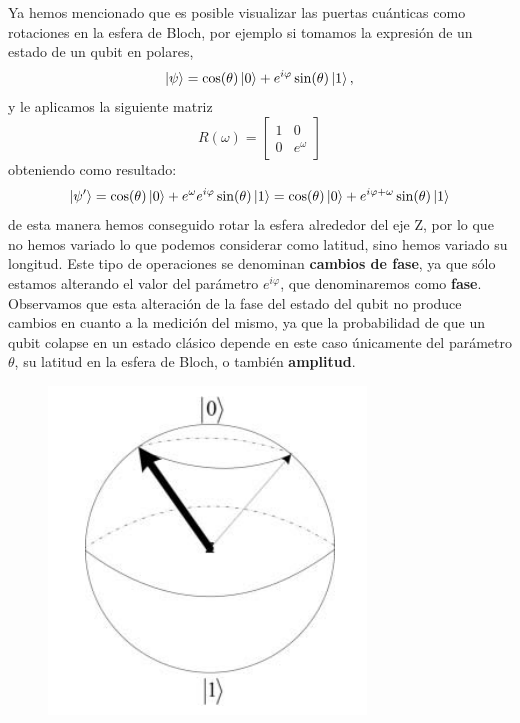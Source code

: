 \documentclass[a4paper]{article}
\numberwithin{equation}{section}
\begin{document}
Ya hemos mencionado que es posible visualizar las puertas cuánticas como rotaciones en la esfera de Bloch, por ejemplo si tomamos la expresión de un estado de un qubit en polares,
\begin{equation}
\ket{\psi} = \cos(\theta)\ket{0} + e^{i\varphi}\sin(\theta)\ket{1},
\end{equation}
y le aplicamos la siguiente matriz
\begin{equation}
R(\omega) = \begin{bmatrix}
	1 & 0 \\
	0 & e^\omega
\end{bmatrix} 
\end{equation}
obteniendo como resultado:
\begin{equation}
\ket{\psi'} = \cos(\theta)\ket{0} + e^\omega e^{i\varphi}\sin(\theta)\ket{1} = \cos(\theta)\ket{0} + e^{i\varphi + \omega}\sin(\theta)\ket{1}
\end{equation}
de esta manera hemos conseguido rotar la esfera alrededor del eje Z, por lo que no hemos variado lo que podemos considerar como latitud, sino hemos variado su longitud. Este tipo de operaciones se denominan \textbf{cambios de fase}, ya que sólo estamos alterando el valor del parámetro $e^{i\varphi}$, que denominaremos como \textbf{fase}. Observamos que esta alteración de la fase del estado del qubit no produce cambios en cuanto a la medición del mismo, ya que la probabilidad de que un qubit colapse en un estado clásico depende en este caso únicamente del parámetro $\theta$, su latitud en la esfera de Bloch, o también \textbf{amplitud}.

\begin{figure}[h]
	\centering
	\includegraphics[scale=.65]{rotacion_fase}
\end{figure}
\end{document}
